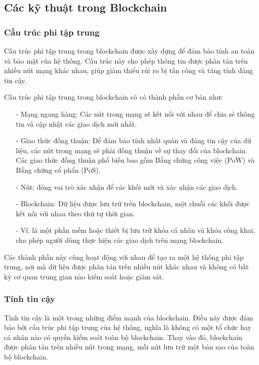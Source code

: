 \subsection{Các kỹ thuật trong Blockchain}
\subsubsection{Cấu trúc phi tập trung}

Cấu trúc phi tập trung trong blockchain được xây dựng 
để đảm bảo tính an toàn và bảo mật của hệ thống. Cấu trúc này cho phép thông tin được phân tán trên nhiều nút mạng khác nhau, giúp giảm thiểu rủi ro bị tấn công và tăng tính đáng tin cậy.

Cấu trúc phi tập trung trong blockchain có có thành phần cơ bản như:
\begin{itemize}
    \item[-] Mạng ngang hàng: Các nút trong mạng sẽ kết 
    nối với nhau để chia sẻ thông tin và cập nhật các giao dịch mới nhất.
    \item[-] Giao thức đồng thuận: Để đảm bảo tính nhất 
    quán và đáng tin cậy của dữ liệu, các nút trong mạng sẽ phải đồng thuận về 
    sự thay đổi của blockchain. Các giao thức đồng thuận phổ biến bao gồm Bằng chứng công việc (PoW)
     và Bằng chứng cổ phẩn (PoS).
    \item[-] Nút: đóng vai trò xác nhận để các khối mới và xác nhận các giao dịch.
    \item[-] Blockchain: Dữ liệu được lưu trữ trên blockchain, một chuỗi
    các khối được kết nối với nhau theo thứ tự thời gian.
    \item[-] Ví: là một phần mềm hoặc thiết bị lưu trữ khóa cá nhân và
    khóa công khai, cho phép người dùng thực hiện các giao dịch trên mạng
    blockchain.
\end{itemize}

Các thành phần này cùng hoạt động với nhau để tạo ra một hệ thống phi tập trung, 
nơi mà dữ liệu được phân tán trên nhiều nút khác nhau và không có bất kỳ cơ quan 
trung gian nào kiểm soát hoặc giám sát.

\subsubsection{Tính tin cậy}
Tính tin cậy là một trong những điểm mạnh của blockchain. Điều 
này được đảm bảo bởi cấu trúc phi tập trung của hệ thống, nghĩa là không có 
một tổ chức hay cá nhân nào có quyền kiểm soát toàn bộ blockchain. Thay vào đó, 
blockchain được phân tán trên nhiều nút trong mạng, mỗi nút lưu trữ một bản sao 
của toàn bộ blockchain.

